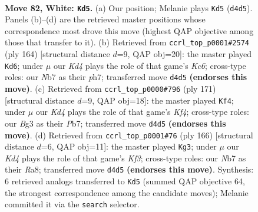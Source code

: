 \documentclass[11pt]{article}
\begin{document}
\clearpage

\begin{figure}[p]\centering
\begin{subfigure}{0.46\textwidth}\centering
\resizebox{\linewidth}{!}{%
\newchessgame
\chessboard[
  setfen={7k/1NP5/2r5/8/3K4/6B1/8/8 w - - 77 82},
  showmover=false,
  pgfstyle=straightmove, color=movearrow, markmove={d4-d5}
]}
\caption{}
\end{subfigure}\hfill
\begin{subfigure}{0.46\textwidth}\centering
\resizebox{\linewidth}{!}{%
\newchessgame
\chessboard[
  setfen={8/6Bp/2K4P/7r/4k3/8/8/8 w - - 25 83},
  showmover=false,
  pgfstyle=straightmove, color=movearrow, markmove={c6-d6}
]}
\caption{}
\end{subfigure}
\\[4pt]
\begin{subfigure}{0.46\textwidth}\centering
\resizebox{\linewidth}{!}{%
\newchessgame
\chessboard[
  setfen={3n4/1p6/8/5k2/2K5/8/5p2/5R2 b - - 3 86},
  showmover=false,
  pgfstyle=straightmove, color=movearrow, markmove={f5-f4}
]}
\caption{}
\end{subfigure}\hfill
\begin{subfigure}{0.46\textwidth}\centering
\resizebox{\linewidth}{!}{%
\newchessgame
\chessboard[
  setfen={R7/4k2P/8/8/7r/2bB1K2/8/8 w - - 47 84},
  showmover=false,
  pgfstyle=straightmove, color=movearrow, markmove={f3-g3}
]}
\caption{}
\end{subfigure}
\caption{\textbf{Move 82, White: \texttt{Kd5}.} (a) Our position; Melanie plays \texttt{Kd5} (\texttt{d4d5}). Panels (b)--(d) are the retrieved master positions whose correspondence most drove this move (highest QAP objective among those that transfer to it). (b) Retrieved from \texttt{ccrl\_top\_p0001\#2574} (ply 164) [structural distance $d$=9, QAP obj=20]: the master played \texttt{Kd6}; under $\mu$ our \emph{Kd4} plays the role of that game's \emph{Kc6}; cross-type roles: our \emph{N}b7 as their \emph{p}h7; transferred move \texttt{d4d5} \textbf{(endorses this move)}. (c) Retrieved from \texttt{ccrl\_top\_p0000\#796} (ply 171) [structural distance $d$=9, QAP obj=18]: the master played \texttt{Kf4}; under $\mu$ our \emph{Kd4} plays the role of that game's \emph{Kf4}; cross-type roles: our \emph{B}g3 as their \emph{P}b7; transferred move \texttt{d4d5} \textbf{(endorses this move)}. (d) Retrieved from \texttt{ccrl\_top\_p0001\#76} (ply 166) [structural distance $d$=6, QAP obj=11]: the master played \texttt{Kg3}; under $\mu$ our \emph{Kd4} plays the role of that game's \emph{Kf3}; cross-type roles: our \emph{N}b7 as their \emph{R}a8; transferred move \texttt{d4d5} \textbf{(endorses this move)}. Synthesis: 6 retrieved analogs transferred to \texttt{Kd5} (summed QAP objective 64, the strongest correspondence among the candidate moves); Melanie committed it via the \texttt{search} selector.}
\label{fig:thought-m162}
\end{figure}
\end{document}
